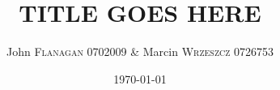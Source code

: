 \documentclass[pdftex,11pt,a4paper]{article}
\author{John \textsc{Flanagan} 0702009 \& Marcin \textsc{Wrzeszcz} 0726753 }
\title{TITLE GOES HERE}
\date{\today}
\begin{document}

\pagebreak





\tableofcontents
\pagebreak

\pagebreak


\pagebreak


\pagebreak


\pagebreak
\def\refname{}


\end{document}
